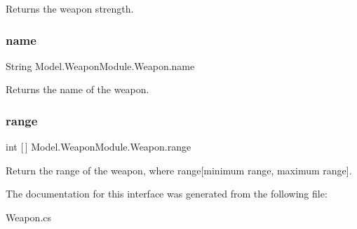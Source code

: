 Returns the weapon strength. \hypertarget{interface_model_1_1_weapon_module_1_1_weapon_a936ccba78ba21dbfb324794f80d90d14}{}\label{interface_model_1_1_weapon_module_1_1_weapon_a936ccba78ba21dbfb324794f80d90d14} 
\subsubsection{\texorpdfstring{name}{name}}
{\footnotesize\ttfamily String Model.\+Weapon\+Module.\+Weapon.\+name\hspace{0.3cm}{\ttfamily [get]}}

Returns the name of the weapon. \hypertarget{interface_model_1_1_weapon_module_1_1_weapon_ae96061ff5fea0e732d63d5b9da0b392c}{}\label{interface_model_1_1_weapon_module_1_1_weapon_ae96061ff5fea0e732d63d5b9da0b392c} 
\subsubsection{\texorpdfstring{range}{range}}
{\footnotesize\ttfamily int \mbox{[}$\,$\mbox{]} Model.\+Weapon\+Module.\+Weapon.\+range\hspace{0.3cm}{\ttfamily [get]}}

Return the range of the weapon, where range\mbox{[}minimum range, maximum range\mbox{]}. 

The documentation for this interface was generated from the following file\+:\begin{DoxyCompactItemize}
\item 
Weapon.\+cs\end{DoxyCompactItemize}
